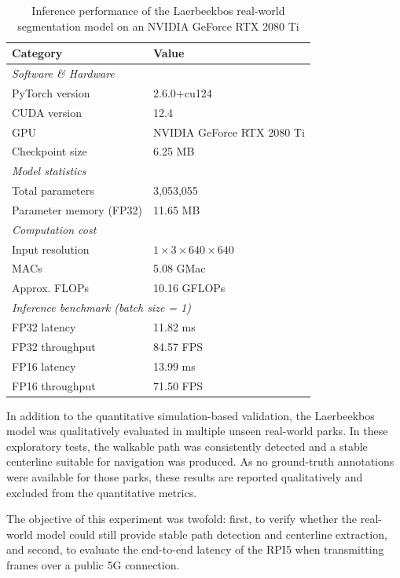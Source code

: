 \documentclass{ieeeaccess}
\begin{document}
\begin{table}[h]
\centering
\caption{Inference performance of the Laerbeekbos real-world segmentation model on an NVIDIA GeForce RTX 2080 Ti}
\label{tab:laerbeekbos_benchmark_2080ti}
\begin{tabular}{ll}
\hline
\textbf{Category} & \textbf{Value} \\
\hline
\multicolumn{2}{l}{\textit{Software \& Hardware}} \\
PyTorch version & 2.6.0+cu124 \\
CUDA version & 12.4 \\
GPU & NVIDIA GeForce RTX 2080 Ti \\
Checkpoint size & 6.25 MB \\
\hline
\multicolumn{2}{l}{\textit{Model statistics}} \\
Total parameters & 3,053,055 \\
Parameter memory (FP32) & 11.65 MB \\
\hline
\multicolumn{2}{l}{\textit{Computation cost}} \\
Input resolution & $1 \times 3 \times 640 \times 640$ \\
MACs & 5.08 GMac \\
Approx. FLOPs & 10.16 GFLOPs \\
\hline
\multicolumn{2}{l}{\textit{Inference benchmark (batch size = 1)}} \\
FP32 latency & 11.82 ms \\
FP32 throughput & 84.57 FPS \\
FP16 latency & 13.99 ms \\
FP16 throughput & 71.50 FPS \\
\hline
\end{tabular}
\end{table}

In addition to the quantitative simulation-based validation, the Laerbeekbos model was qualitatively evaluated in multiple unseen real-world parks. In these exploratory tests, the walkable path was consistently detected and a stable centerline suitable for navigation was produced. As no ground-truth annotations were available for those parks, these results are reported qualitatively and excluded from the quantitative metrics.

The objective of this experiment was twofold: first, to verify whether the real-world model could still provide stable path detection and centerline extraction, and second, to evaluate the end-to-end latency of the RPI5 when transmitting frames over a public 5G connection.
\end{document}
